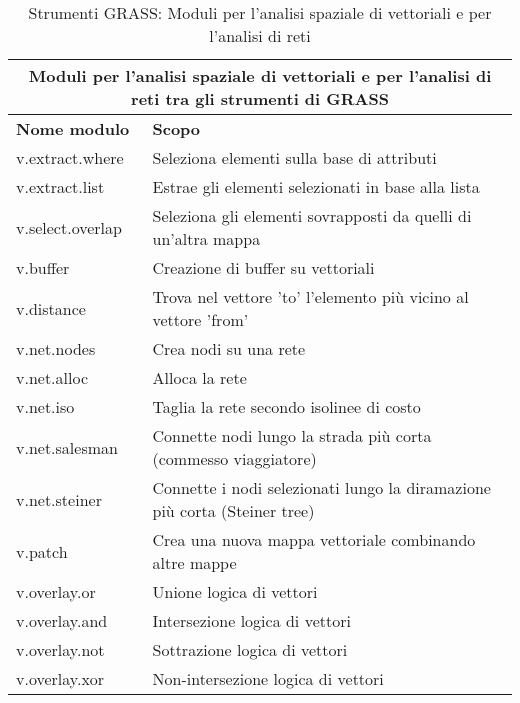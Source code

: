\begin{table}[ht]
\centering
\caption{Strumenti GRASS: Moduli per l'analisi spaziale di vettoriali e per l'analisi di reti}\medskip
 \begin{tabular}{|p{4cm}|p{12cm}|}
  \hline \multicolumn{2}{|c|}{\textbf{Moduli per l'analisi spaziale di vettoriali e per l'analisi di reti tra gli strumenti di GRASS}} \\
  \hline \textbf{Nome modulo} & \textbf{Scopo} \\
  \hline v.extract.where & Seleziona elementi sulla base di attributi \\
  \hline v.extract.list & Estrae gli elementi selezionati in base alla lista \\
  \hline v.select.overlap & Seleziona gli elementi sovrapposti da quelli di un'altra mappa \\
  \hline v.buffer & Creazione di buffer su vettoriali \\
  \hline v.distance & Trova nel vettore 'to' l'elemento più vicino al vettore 'from' \\
  \hline v.net.nodes & Crea nodi su una rete \\
  \hline v.net.alloc & Alloca la rete \\
  \hline v.net.iso & Taglia la rete secondo isolinee di costo \\
  \hline v.net.salesman & Connette nodi lungo la strada più corta (commesso viaggiatore) \\
  \hline v.net.steiner & Connette i nodi selezionati lungo la diramazione più corta (Steiner
  tree) \\
  \hline v.patch & Crea una nuova mappa vettoriale combinando altre mappe \\
  \hline v.overlay.or & Unione logica di vettori \\
  \hline v.overlay.and & Intersezione logica di vettori \\
  \hline v.overlay.not & Sottrazione logica di vettori \\
  \hline v.overlay.xor & Non-intersezione logica di vettori \\
\hline
\end{tabular}
\end{table}

